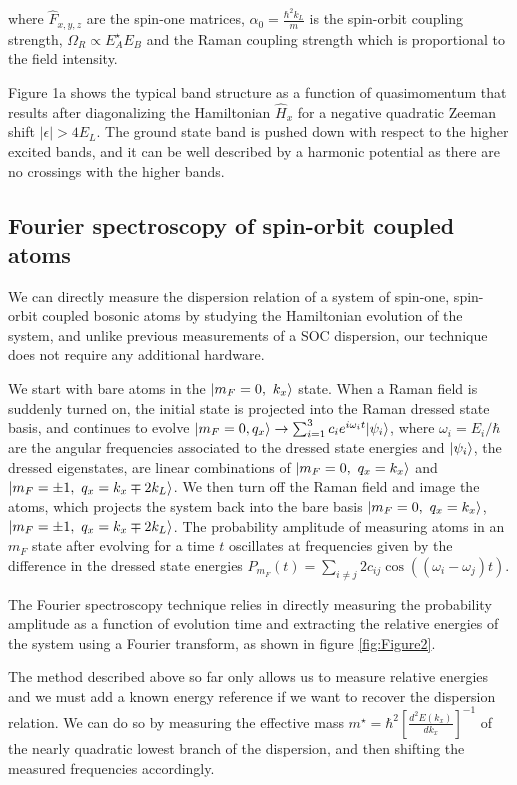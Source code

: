  where $\hat{F}_{x,y,z}$ are the spin-one matrices,  $\alpha_0=\frac{\hbar^2k_L}{m}$ is the spin-orbit coupling strength, $\Omega_R\propto E_A^{\star}E_B$ and the Raman coupling strength which is proportional to the field intensity. 
 
Figure 1a shows the typical band structure as a function of quasimomentum that results after diagonalizing the Hamiltonian $\hat{H}_x$ for a negative quadratic Zeeman shift $|\epsilon|>4E_L$. The ground state band is pushed down with respect to the higher excited bands, and it can be well described by a harmonic potential as there are no crossings with the higher bands. 

\subsection{Fourier spectroscopy of spin-orbit coupled atoms}		

 We can directly measure the dispersion relation of a system of spin-one, spin-orbit coupled bosonic atoms by studying the Hamiltonian evolution of the system, and unlike previous measurements of a SOC dispersion, our technique does not require any additional hardware. 

We start with bare atoms in the $|m_F=0,\ k_x\rangle$ state. When a Raman field is suddenly turned on, the initial state is projected into the Raman dressed state basis, and continues to evolve 
$|m_F=0, q_x\rangle\rightarrow \sum_{i=1}^3c_{i}e^{i\omega_it} |\psi_i\rangle$, where $\omega_i=E_i/\hbar$ are the angular frequencies associated to the dressed state energies and $|\psi_i\rangle$, the dressed eigenstates,  are linear combinations of $\ket{m_F=0,\ q_x=k_x}$ and $\ket{m_F=\pm1,\ q_x=k_x\mp2k_L}$. We then turn off the Raman field and image the atoms, which projects the system back into the bare basis $\ket{m_F=0,\ q_x=k_x}$, $\ket{m_F=\pm1,\ q_x=k_x\mp2k_L}$. The probability amplitude of measuring atoms in an $m_F$ state after evolving for a time $t$ oscillates at frequencies given by the difference in the dressed state energies $P_{m_F}(t)=\sum\limits_{i\neq j} 2c_{ij}\cos((\omega_i-\omega_j)t)$.

The Fourier spectroscopy technique relies in directly measuring the probability amplitude as a function of evolution time and extracting the relative energies of the system using a Fourier transform, as shown in figure \ref{fig:Figure2}.

The method described above so far only allows us to measure relative energies and we must add a known energy reference if we want to recover the dispersion relation. We can do so by measuring the effective mass $m^{\star} = \hbar^2[\frac{d^2E(k_x)}{dk_x}]^{-1}$ of the nearly quadratic lowest branch of the dispersion, and then shifting the measured frequencies accordingly. 

